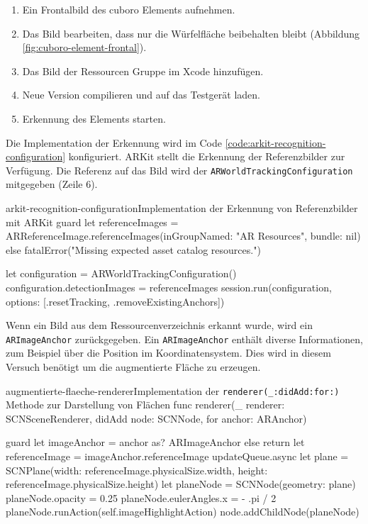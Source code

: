 \begin{description}
	\begin{enumerate}
		\item Ein Frontalbild des cuboro Elements aufnehmen.
		\item Das Bild bearbeiten, dass nur die Würfelfläche beibehalten bleibt (Abbildung \ref{fig:cuboro-element-frontal}).
		\item Das Bild der Ressourcen Gruppe im Xcode hinzufügen.
		\item Neue Version compilieren und auf das Testgerät laden.
		\item Erkennung des Elements starten.  
	\end{enumerate}


	Die Implementation der Erkennung wird im Code \ref{code:arkit-recognition-configuration} konfiguriert. ARKit stellt die Erkennung der Referenzbilder zur Verfügung. Die Referenz auf das Bild wird der \texttt{ARWorldTrackingConfiguration} mitgegeben (Zeile 6).

	\begin{code}{arkit-recognition-configuration}{Implementation der Erkennung von Referenzbilder mit ARKit}
	guard let referenceImages = ARReferenceImage.referenceImages(inGroupNamed: "AR Resources", bundle: nil) else {
		fatalError("Missing expected asset catalog resources.")
	}
	
	let configuration = ARWorldTrackingConfiguration()
	configuration.detectionImages = referenceImages
	session.run(configuration, options: [.resetTracking, .removeExistingAnchors])
	\end{code}

	Wenn ein Bild aus dem Ressourcenverzeichnis erkannt wurde, wird ein \texttt{ARImageAnchor} zurückgegeben. Ein \texttt{ARImageAnchor} enthält diverse Informationen, zum Beispiel über die Position im Koordinatensystem. Dies wird in diesem Versuch benötigt um die augmentierte Fläche zu erzeugen. 

	\begin{code}{augmentierte-flaeche-renderer}{Implementation der \texttt{renderer(\_:didAdd:for:)} Methode zur Darstellung von Flächen}
		func renderer(_ renderer: SCNSceneRenderer, didAdd node: SCNNode, for anchor: ARAnchor) {
			guard let imageAnchor = anchor as? ARImageAnchor else { return }
			let referenceImage = imageAnchor.referenceImage
			updateQueue.async {
				let plane = SCNPlane(width: referenceImage.physicalSize.width,
									height: referenceImage.physicalSize.height)
				let planeNode = SCNNode(geometry: plane)
				planeNode.opacity = 0.25
				planeNode.eulerAngles.x =  - .pi / 2
				planeNode.runAction(self.imageHighlightAction)
				node.addChildNode(planeNode)
			}

}
\end{code}
\end{description}
